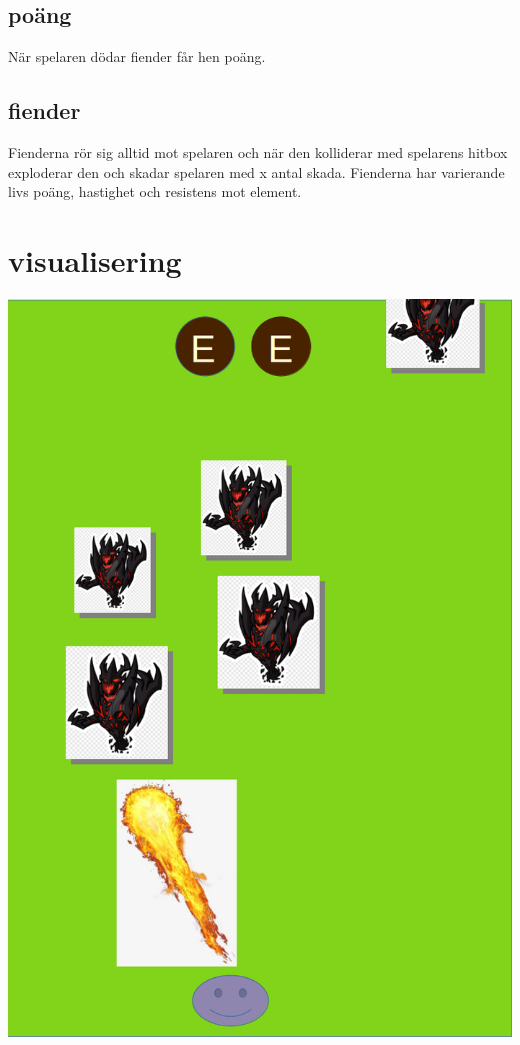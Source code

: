 \documentclass[12pt]{TDP005mall}
\begin{document}
\subsection{poäng}
När spelaren dödar fiender får hen poäng.
\subsection{fiender}
Fienderna rör sig alltid mot spelaren och när den kolliderar med spelarens hitbox exploderar den och skadar spelaren med x antal skada. Fienderna har varierande livs poäng, hastighet och resistens mot element.
\section{visualisering}
\begin{center}
\includegraphics[scale=0.5]{spel.png}
\end{center}
\newpage
\end{document}
